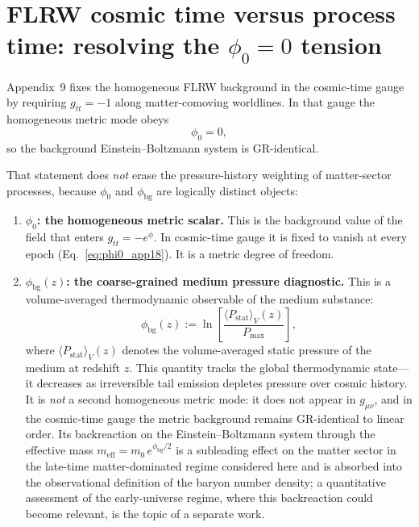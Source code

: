 \documentclass[11pt]{article}
\begin{document}
\section{FLRW cosmic time versus process time: resolving the $\phi_0=0$
  tension}
\label{sec:flrw_vs_process_app18}

Appendix~9 fixes the homogeneous FLRW background in the cosmic-time gauge
by requiring $g_{tt}=-1$ along matter-comoving worldlines.  In that gauge
the homogeneous metric mode obeys
\begin{equation}
  \phi_0 = 0,
  \label{eq:phi0_app18}
\end{equation}
so the background Einstein--Boltzmann system is GR-identical.

That statement does \emph{not} erase the pressure-history weighting of
matter-sector processes, because $\phi_0$ and $\phi_{\mathrm{bg}}$
are logically distinct objects:
\begin{enumerate}
\item \textbf{$\phi_0$: the homogeneous metric scalar.}  This is the
  background value of the field that enters $g_{tt}=-e^{\phi}$.  In
  cosmic-time gauge it is fixed to vanish at every epoch
  (Eq.~\ref{eq:phi0_app18}).  It is a metric degree of freedom.
\item \textbf{$\phi_{\mathrm{bg}}(z)$: the coarse-grained medium
  pressure diagnostic.}  This is a volume-averaged thermodynamic
  observable of the medium substance:
  \begin{equation}
    \phi_{\mathrm{bg}}(z)
    := \ln\!\left[\frac{\langle P_{\mathrm{stat}}\rangle_V(z)}
                       {P_{\max}}\right],
    \label{eq:phibg_def_app18}
  \end{equation}
  where $\langle P_{\mathrm{stat}}\rangle_V(z)$ denotes the
  volume-averaged static pressure of the medium at redshift $z$.
  This quantity tracks the global thermodynamic state---it decreases
  as irreversible tail emission depletes pressure over cosmic
  history.  It is \emph{not} a second homogeneous metric mode: it
  does not appear in $g_{\mu\nu}$, and in the cosmic-time gauge the
  metric background remains GR-identical to linear order.  Its
  backreaction on the Einstein--Boltzmann system through the
  effective mass
  $m_{\mathrm{eff}} = m_0\,e^{\phi_{\mathrm{bg}}/2}$ is a subleading
  effect on the matter sector in the late-time matter-dominated
  regime considered here and is absorbed into the observational
  definition of the baryon number density; a quantitative assessment
  of the early-universe regime, where this backreaction could become
  relevant, is the topic of a separate work.
\end{enumerate}
\end{document}
